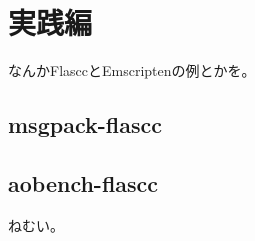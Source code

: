 \section{実践編}
なんかFlasccとEmscriptenの例とかを。

\subsection{msgpack-flascc}

\subsection{aobench-flascc}

ねむい。
